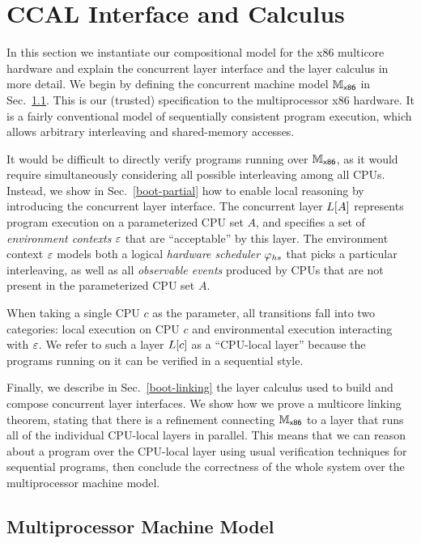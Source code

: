 \section{CCAL Interface and Calculus}
\label{chapter:ccal:sec:interface-calculus}

In this section we instantiate our compositional model
for the x86 multicore hardware and explain the concurrent layer interface and the layer calculus in more detail.
We begin by defining the concurrent machine model $\mathbb{M}_{\mathsf{x86}}$ in
Sec.~\ref{boot-total}. This is our (trusted)%
specification to the multiprocessor x86 hardware. It
is a fairly conventional model of sequentially consistent program
execution, which allows arbitrary interleaving
and shared-memory
accesses. 

It would be difficult to directly verify programs running 
over $\mathbb{M}_{\mathsf{x86}}$, as it would require
simultaneously considering
all possible interleaving among all CPUs.
Instead, we show in Sec.~\ref{boot-partial} how to enable local reasoning
by introducing the concurrent layer interface.
The concurrent layer $L[A]$ represents program execution 
on a parameterized CPU set $A$,
and specifies a set of \emph{environment contexts} $\oracle$
that are ``acceptable'' by this layer. The environment context $\oracle$
models both a logical \emph{hardware scheduler} $\varphi_{hs}$
that picks a particular interleaving, as well as all 
\emph{observable events} produced by CPUs that are not present in 
the parameterized CPU set $A$.

When taking  a single CPU $c$ as the parameter,
all  transitions
fall into two categories:
local execution on CPU $c$
and environmental execution  interacting with $\oracle$.
We refer to such a layer $L[c]$
as a ``CPU-local layer'' because the programs running on 
it can be verified in a sequential style.

Finally, we describe in Sec.~\ref{boot-linking} the layer calculus used to build and compose concurrent layer interfaces.
We show how we
prove a multicore linking theorem, stating that there is a refinement connecting $\mathbb{M}_{\mathsf{x86}}$ to
a layer that runs all of the individual CPU-local layers 
in parallel.
This means that we can reason about a program over the CPU-local layer
using usual verification techniques for sequential programs,
then conclude the correctness of the whole system over the
multiprocessor machine model.


\subsection{Multiprocessor Machine Model}
\label{boot-total}


